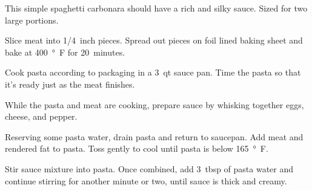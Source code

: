 
This simple spaghetti carbonara should have a rich and silky sauce. Sized for two large portions.


Slice meat into \SI{1/4}{inch} pieces. Spread out pieces on foil lined baking sheet and bake at \SI{400}{°F} for \SI{20}{minutes}.

\begin{ingredients}
\end{ingredients}

Cook pasta according to packaging in a \SI{3}{qt} sauce pan. Time the pasta so that it's ready just as the meat finishes.

\begin{ingredients}
\end{ingredients}

While the pasta and meat are cooking, prepare sauce by whisking together eggs, cheese, and pepper.

\begin{ingredients}
\end{ingredients}

Reserving some pasta water, drain pasta and return to saucepan. Add meat and rendered fat to pasta. Toss gently to cool until pasta is below \SI{165}{°F}.

Stir sauce mixture into pasta. Once combined, add \SI{3}{tbsp} of pasta water and continue stirring for another minute or two, until sauce is thick and creamy.
